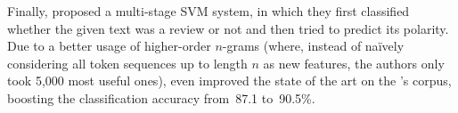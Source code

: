 Finally, \citet{Ng:06} proposed a multi-stage SVM system, in which
they first classified whether the given text was a review or not and
then tried to predict its polarity.  Due to a better usage of
higher-order $n$-grams (where, instead of na{\"i}vely considering all
token sequences up to length $n$ as new features, the authors only
took 5,000 most useful ones), \citet{Ng:06} even improved the state of
the art on the \citeauthor{Pang:04}'s corpus, boosting the
classification accuracy from~87.1 to~90.5\%.




